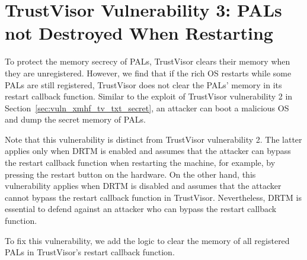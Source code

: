 \section{TrustVisor Vulnerability 3: PALs not Destroyed When Restarting}
\label{sec:vuln_xmhf_tv_restart_clean_pal}

To protect the memory secrecy of PALs, TrustVisor clears their memory when they are unregistered. However, we find that if the rich OS restarts while some PALs are still registered, TrustVisor does not clear the PALs' memory in its restart callback function. Similar to the exploit of TrustVisor vulnerability 2 in Section~\ref{sec:vuln_xmhf_tv_txt_secret}, an attacker can boot a malicious OS and dump the secret memory of PALs.

Note that this vulnerability is distinct from TrustVisor vulnerability 2. The latter applies only when DRTM is enabled and assumes that the attacker can bypass the restart callback function when restarting the machine, for example, by pressing the restart button on the hardware. On the other hand, this vulnerability applies when DRTM is disabled and assumes that the attacker cannot bypass the restart callback function in TrustVisor. Nevertheless, DRTM is essential to defend against an attacker who can bypass the restart callback function.

To fix this vulnerability, we add the logic to clear the memory of all registered PALs in TrustVisor's restart callback function.

